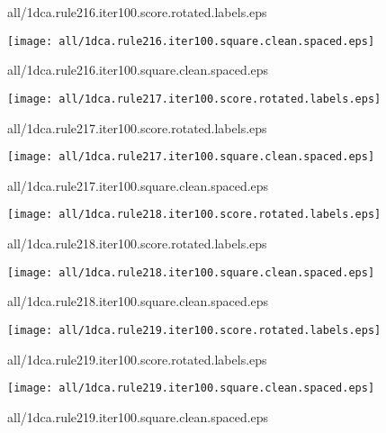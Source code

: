 \documentclass{article}
\begin{document}
{\footnotesize all/1dca.rule216.iter100.score.rotated.labels.eps}
\begin{center}
\begin{minipage}{\textwidth}
\texttt{[image: all/1dca.rule216.iter100.square.clean.spaced.eps]}
\end{minipage}
\end{center}
{\footnotesize all/1dca.rule216.iter100.square.clean.spaced.eps}
\begin{center}
\begin{minipage}{\textwidth}
\texttt{[image: all/1dca.rule217.iter100.score.rotated.labels.eps]}
\end{minipage}
\end{center}
{\footnotesize all/1dca.rule217.iter100.score.rotated.labels.eps}
\begin{center}
\begin{minipage}{\textwidth}
\texttt{[image: all/1dca.rule217.iter100.square.clean.spaced.eps]}
\end{minipage}
\end{center}
{\footnotesize all/1dca.rule217.iter100.square.clean.spaced.eps}
\begin{center}
\begin{minipage}{\textwidth}
\texttt{[image: all/1dca.rule218.iter100.score.rotated.labels.eps]}
\end{minipage}
\end{center}
{\footnotesize all/1dca.rule218.iter100.score.rotated.labels.eps}
\begin{center}
\begin{minipage}{\textwidth}
\texttt{[image: all/1dca.rule218.iter100.square.clean.spaced.eps]}
\end{minipage}
\end{center}
{\footnotesize all/1dca.rule218.iter100.square.clean.spaced.eps}
\begin{center}
\begin{minipage}{\textwidth}
\texttt{[image: all/1dca.rule219.iter100.score.rotated.labels.eps]}
\end{minipage}
\end{center}
{\footnotesize all/1dca.rule219.iter100.score.rotated.labels.eps}
\begin{center}
\begin{minipage}{\textwidth}
\texttt{[image: all/1dca.rule219.iter100.square.clean.spaced.eps]}
\end{minipage}
\end{center}
{\footnotesize all/1dca.rule219.iter100.square.clean.spaced.eps}
\end{document}
